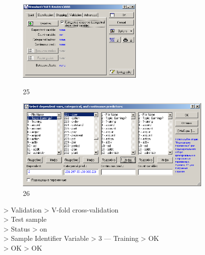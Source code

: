 \begin{figure}[!h]
  \centering

  \begin{minipage}{0.29\textwidth}
    \centering

    \includegraphics[height=4cm]
    {inc/25.PNG}

    \caption{25}

    \label{fig:25}
  \end{minipage}
  \begin{minipage}{0.69\textwidth}
    \centering

    \includegraphics[height=4.5cm]
    {inc/26.PNG}

    \caption{26}

    \label{fig:26}
  \end{minipage}
\end{figure}

> Validation > V-fold cross-validation \\
> Test sample \\
> Status > on \\
> Sample Identifier Variable > 3 — Training > OK \\
> OK > OK \\

